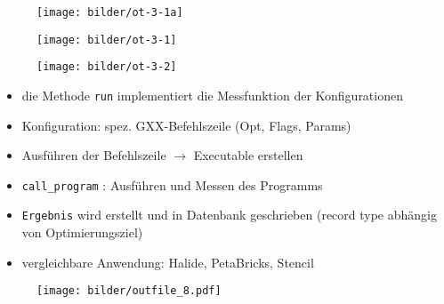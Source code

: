   \begin{frame}
    \begin{figure}[ht]
      \centering	      
      \texttt{[image: bilder/ot-3-1a]}
      \label{gccpy1a}
    \end{figure}
  \end{frame}
  
  
  \begin{frame}
    \begin{figure}[ht]
      \centering	      
      \texttt{[image: bilder/ot-3-1]}
      \label{gccpy1}
    \end{figure}
  \end{frame}
  
  
  \begin{frame}
    \begin{figure}[ht]
      \centering	      
      \texttt{[image: bilder/ot-3-2]}
      \label{gccpy2}
    \end{figure}
  \end{frame}
  
  
 \begin{frame}
   \begin{itemize}
     \item die Methode \texttt{run} implementiert die Messfunktion der Konfigurationen
     \item Konfiguration: spez. GXX-Befehlszeile (Opt, Flags, Params)
     \item Ausführen der Befehlszeile $\rightarrow$ Executable erstellen
     \item \texttt{call\_program} : Ausführen und Messen des Programms
     \item \texttt{Ergebnis} wird erstellt und in Datenbank geschrieben 
     (record type abhängig von Optimierungsziel) \newline
     \item vergleichbare Anwendung: Halide, PetaBricks, Stencil
   \end{itemize}
 \end{frame}
 
  \begin{frame}
      \begin{figure}[ht]
      \centering	      
      \texttt{[image: bilder/outfile\_8.pdf]}
      \label{gccResults}
    \end{figure}
  \end{frame}    
    
